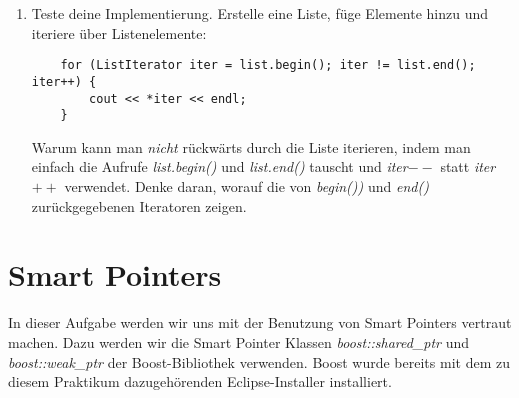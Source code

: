 \documentclass[
  accentcolor=tud1c,	%
  colorbacktitle,		%
  inverttitle,			%
  german,				%
  twoside
]{tudexercise}
\begin{document}
\begin{enumerate}
\item
Teste deine Implementierung.
Erstelle eine Liste, füge Elemente hinzu und iteriere über Listenelemente:

\begin{lstlisting}
	for (ListIterator iter = list.begin(); iter != list.end(); iter++) {
		cout << *iter << endl;
	}
\end{lstlisting}

Warum kann man \emph{nicht} rückwärts durch die Liste iterieren, indem man einfach die Aufrufe \emph{list.begin()} und \emph{list.end()} tauscht und \emph{iter$--$} statt \emph{iter$++$} verwendet.
Denke daran, worauf die von \emph{begin())} und \emph{end()} zurückgegebenen Iteratoren zeigen.

\end{enumerate}

\section{Smart Pointers}
In dieser Aufgabe werden wir uns mit der Benutzung von Smart Pointers vertraut machen. Dazu werden wir die Smart Pointer Klassen \emph{boost::shared\_ptr} und \emph{boost::weak\_ptr} der Boost-Bibliothek verwenden.
Boost wurde bereits mit dem zu diesem Praktikum dazugehörenden Eclipse-Installer installiert. 
\end{document}
